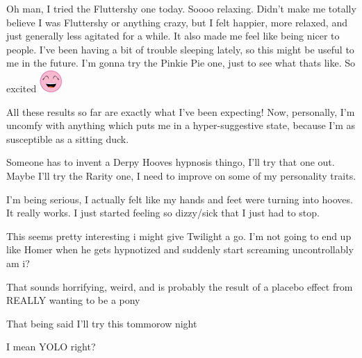\documentclass[ebook,12pt,oneside,openany]{memoir}
\begin{document}
\begin{tcolorbox}[title=G.Dot]
\par{Oh man, I tried the Fluttershy one today. Soooo relaxing. Didn't make me totally believe I was Fluttershy or anything crazy, but I felt happier, more relaxed, and just generally less agitated for a while. It also made me feel like being nicer to people. I've been having a bit of trouble sleeping lately, so this might be useful to me in the future. I'm gonna try the Pinkie Pie one, just to see what thats like. So excited  \includegraphics{images/mlp_laugh.png}}
\end{tcolorbox}
\begin{tcolorbox}[title=Devvy \ding{170}Flutties\ding{170},colback=teal!5!white,colframe=teal!75!black,coltitle=white]
\par{All these results so far are exactly what I've been expecting! Now, personally, I'm uncomfy with anything which puts me in a hyper-suggestive state, because I'm as susceptible as a sitting duck.}
\newline{}
\par{Someone has to invent a Derpy Hooves hypnosis thingo, I'll try that one out. Maybe I'll try the Rarity one, I need to improve on some of my personality traits.}
\end{tcolorbox}
\begin{tcolorbox}[title=go away seb]
\par{I'm being serious, I actually felt like my hands and feet were turning into hooves. It really works. I just started feeling so dizzy/sick that I just had to stop.}
\end{tcolorbox}
\begin{tcolorbox}[title=Bucky McGillyCuddy]
\par{This seems pretty interesting i might give Twilight a go. I'm not going to end up like Homer when he gets hypnotized and suddenly start screaming uncontrollably am i?}
\end{tcolorbox}
\begin{tcolorbox}[title=Ezio Auditore]
\par{That sounds horrifying, weird, and is probably the result of a placebo effect from REALLY wanting to be a pony}
\newline{}
\par{That being said I'll try this tommorow night}
\newline{}
\par{I mean YOLO right? }
\end{tcolorbox}
\end{document}
